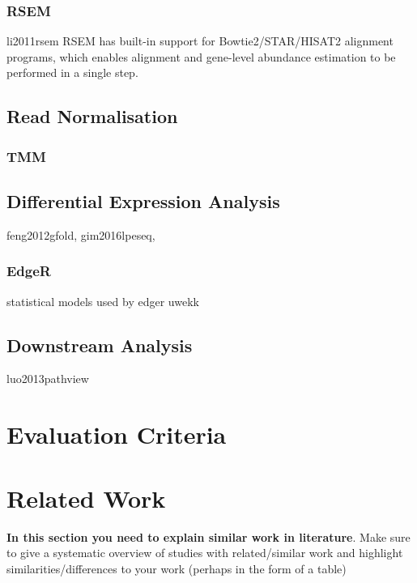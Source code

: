 \subsubsection{RSEM}
li2011rsem
RSEM has built-in support for Bowtie2/STAR/HISAT2 alignment programs, which 
enables alignment and gene-level abundance estimation to be performed in a 
single step.


\subsection{Read Normalisation}

\subsubsection{TMM}
\citep{edger}

\subsection{Differential Expression Analysis}
feng2012gfold, gim2016lpeseq, \citep{edger}
%
\subsubsection{EdgeR}

statistical models used by edger uwekk

\subsection{Downstream Analysis}

luo2013pathview

\section{Evaluation Criteria}

\section{Related Work}
\textbf{In this section you need to explain similar work in literature}.  Make sure to give a systematic overview of studies with related/similar work and highlight similarities/differences to your work (perhaps in the form of a table)

